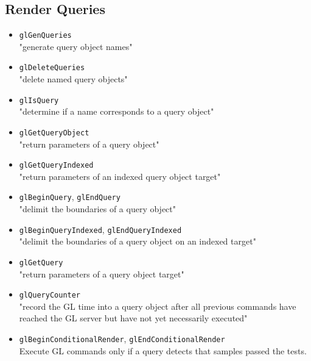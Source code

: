 \documentclass[12pt]{article}
\begin{document}
\subsection{Render Queries}
\begin{itemize}
\item \texttt{glGenQueries} \\
	"generate query object names"
\item \texttt{glDeleteQueries} \\
	"delete named query objects"
\item \texttt{glIsQuery} \\
	"determine if a name corresponds to a query object"
\item \texttt{glGetQueryObject} \\
	"return parameters of a query object"
\item \texttt{glGetQueryIndexed} \\
	"return parameters of an indexed query object target"
\item \texttt{glBeginQuery}, \texttt{glEndQuery} \\
	"delimit the boundaries of a query object"
\item \texttt{glBeginQueryIndexed}, \texttt{glEndQueryIndexed} \\
	"delimit the boundaries of a query object on an indexed target"
\item \texttt{glGetQuery} \\
	"return parameters of a query object target"
\item \texttt{glQueryCounter} \\
	"record the GL time into a query object after all previous commands have reached the GL server but have not yet necessarily executed"
\item \texttt{glBeginConditionalRender}, \texttt{glEndConditionalRender} \\
	Execute GL commands only if a query detects that samples passed the tests.
\end{itemize}
\end{document}
